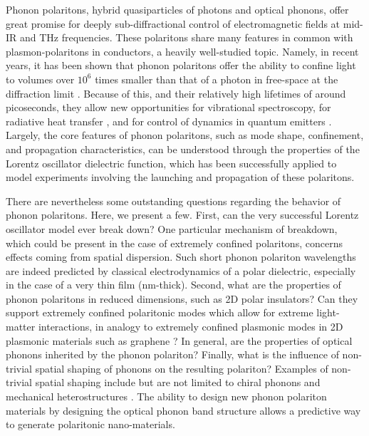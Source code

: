 \documentclass[superscriptaddress,reprint,prb]{revtex4-1}
\begin{document}
\maketitle

Phonon polaritons, hybrid quasiparticles of photons and optical phonons, offer great promise for deeply sub-diffractional control of electromagnetic fields at mid-IR and THz frequencies. These polaritons share many features in common with plasmon-polaritons in conductors, a heavily well-studied topic. Namely, in recent years, it has been shown that phonon polaritons offer the ability to confine light to volumes over $10^6$ times smaller than that of a photon in free-space at the diffraction limit \cite{caldwell2013low,xu2014mid,caldwell2014sub,dai2014tunable,tomadin2015accessing,yoxall2015direct,li2015hyperbolic,dai2015subdiffractional,dai2015graphene,caldwell2015low,li2016reversible,Basov:2016,basov2017towards,low2017polaritons,giles2017ultra}. Because of this, and their relatively high lifetimes of around picoseconds, they allow new opportunities for vibrational spectroscopy, for radiative heat transfer \cite{hillenbrand2002phonon}, and for control of dynamics in quantum emitters \cite{kumar2015tunable,rivera2017making}. Largely, the core features of phonon polaritons, such as mode shape, confinement, and propagation characteristics, can be understood through the properties of the Lorentz oscillator dielectric function, which has been successfully applied to model experiments involving the launching and propagation of these polaritons.

There are nevertheless some outstanding questions regarding the behavior of phonon polaritons. Here, we present a few. First, can the very successful Lorentz oscillator model ever break down? One particular mechanism of breakdown, which could be present in the case of extremely confined polaritons, concerns effects coming from spatial dispersion. Such short phonon polariton wavelengths are indeed predicted by classical electrodynamics of a polar dielectric, especially in the case of a very thin film (nm-thick). Second, what are the properties of phonon polaritons in reduced dimensions, such as 2D polar insulators? Can they support extremely confined polaritonic modes which allow for extreme light-matter interactions, in analogy to extremely confined plasmonic modes in 2D plasmonic materials such as graphene \cite{jablan2009plasmonics, koppens2011graphene, fei2012gate, chen2012optical,rivera2016shrinking,lundeberg2017tuning}? In general, are the properties of optical phonons inherited by the phonon polariton? Finally, what is the influence of non-trivial spatial shaping of phonons on the resulting polariton? Examples of non-trivial spatial shaping include but are not limited to chiral phonons \cite{zhu2018observation} and mechanical heterostructures \cite{ratchford2018controlling}. The ability to design new phonon polariton materials by designing the optical phonon band structure allows a predictive way to generate polaritonic nano-materials.
\end{document}
